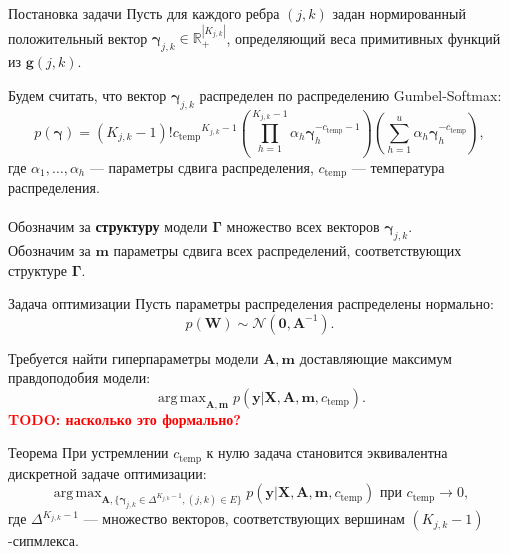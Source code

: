 \documentclass[usenames,dvipsnames,11pt,pdf,utf8,russian,aspectratio=169]{beamer}
\DeclareMathOperator*{\argmax}{arg\,max}
\begin{document}
\begin{frame}{ Постановка задачи}
Пусть для каждого ребра $(j,k)$ задан нормированный положительный вектор $\boldsymbol{\gamma}_{j,k} \in \mathbb{R}_{+}^{|K_{j,k}|}$, определяющий веса примитивных функций из  $\mathbf{g}(j,k)$.

Будем считать, что вектор $\boldsymbol{\gamma}_{j,k}$ распределен по распределению Gumbel-Softmax:
\[
    p(\boldsymbol{\gamma}) = (K_{j,k}-1)!{c_{\text{temp}}}^{K_{j,k}-1}\left(\prod_{h=1}^{K_{j,k}-1} \alpha_h \boldsymbol{\gamma}_h^{-c_{\text{temp}}-1}\right)\left(\sum_{h=1}^u\alpha_h\boldsymbol{\gamma}_h^{-c_{\text{temp}}}\right),
\] 
где $\alpha_1,\dots,\alpha_h$ --- параметры сдвига распределения, $c_{\text{temp}}$ --- температура распределения. 
\\~\\
Обозначим за \textbf{структуру} модели $\boldsymbol{\Gamma}$ множество всех векторов $\boldsymbol{\gamma}_{j,k}$.\\
Обозначим за $\mathbf{m}$ параметры сдвига всех распределений, соответствующих структуре $\boldsymbol{\Gamma}$.

\end{frame}


\begin{frame}{Задача оптимизации}
Пусть параметры распределения распределены нормально:
\[
    p(\mathbf{W}) \sim \mathcal{N}(\mathbf{0}, \mathbf{A}^{-1}).
\]

Требуется найти гиперпараметры модели $\mathbf{A}, \mathbf{m}$ доставляющие максимум правдоподобия модели:
\[
    \argmax_{\mathbf{A}, \mathbf{m}}  p(\mathbf{y}|\mathbf{X},\mathbf{A},\mathbf{m}, c_{\text{temp}}).
\]                                                                                                                            
\textcolor{red}{\textbf{TODO: насколько это формально?\\}}
\begin{block}{Теорема}
При устремлении $c_{\text{temp}}$ к нулю задача становится эквивалентна дискретной задаче оптимизации:
\[
    \argmax_{\mathbf{A}, \{\boldsymbol{\gamma}_{j,k} \in \Delta^{K_{j,k} -1}, (j,k) \in E\}} p(\mathbf{y}|\mathbf{X},\mathbf{A},\mathbf{m}, c_{\text{temp}}) \text{ при }c_{\text{temp}} \to 0,
\]    
где $\Delta^{K_{j,k} -1}$ --- множество векторов, соответствующих вершинам $(K_{j,k}-1)$-сипмлекса.
\end{block}           
\end{frame}  


                                                                                                                                       
                                                                                                                                    
\end{document}
